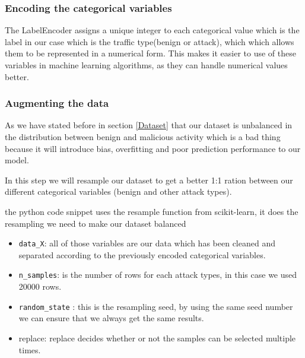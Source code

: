 \subsubsection{Encoding the categorical variables}
The LabelEncoder assigns a unique integer to each categorical value which is the label in our case which is the traffic type(benign or attack), which which allows them to be represented in a numerical form. This makes it easier to use of these variables in machine learning algorithms, as they can handle numerical values better.








\subsubsection{Augmenting the data}
As we have stated before in section \ref{Dataset} that our dataset is unbalanced in the distribution between benign and malicious activity which is a bad thing because it will introduce bias, overfitting and poor prediction performance to our model.







In this step we will resample our dataset to get a better 1:1 ration between our different categorical variables (benign and other attack types).



the python code snippet uses the resample function from scikit-learn, it does the resampling we need to make our dataset balanced 

\begin{itemize}
	\item \texttt{data\_X}: all of those variables are our data which has been cleaned and separated according to the previously encoded categorical variables.
	\item \texttt{n\_samples}: is the number of rows for each attack types, in this case we used 20000 rows.
	\item \texttt{random\_state} : this is the resampling seed, by using the same seed number we can ensure that we always get the same results.
	\item replace: replace decides whether or not the samples can be selected multiple times.
\end{itemize}



